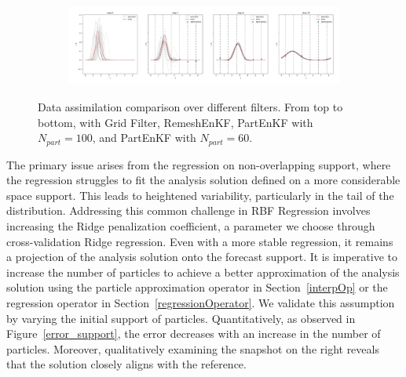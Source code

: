 \begin{figure}
	\centering
	\begin{subfigure}{\textwidth}
		\includegraphics[width=\textwidth]{images/app1d/wo_calibration/remesh_EnKF.png}
	\end{subfigure}
	\caption{Data assimilation comparison over different filters. From top to bottom, with Grid Filter, RemeshEnKF, PartEnKF with $N_{part}=100$, and PartEnKF with $N_{part}=60$.}
\end{figure}
\newpage

The primary issue arises from the regression on non-overlapping support, where the regression struggles to fit the analysis solution defined on a more considerable space support. This leads to heightened variability, particularly in the tail of the distribution. Addressing this common challenge in RBF Regression \cite{fornberg_flyer_2015} involves increasing the Ridge penalization coefficient, a parameter we choose through cross-validation Ridge regression.
Even with a more stable regression, it remains a projection of the analysis solution onto the forecast support. It is imperative to increase the number of particles to achieve a better approximation of the analysis solution using the particle approximation operator in Section~\ref{interpOp} or the regression operator in Section~\ref{regressionOperator}.
We validate this assumption by varying the initial support of particles. Quantitatively, as observed in Figure~\ref{error_support}, the error decreases with an increase in the number of particles. Moreover, qualitatively examining the snapshot on the right reveals that the solution closely aligns with the reference.

